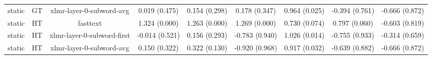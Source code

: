 \begin{sidewaystable}[htb]
\begin{tabular}{@{}ccccccccc@{}}
        static & GT & xlmr-layer-0-subword-avg & 0.019 (0.475) & 0.154 (0.298) & 0.178 (0.347) & 0.964 (0.025) & -0.394 (0.761) & -0.666 (0.872) \\
        static & HT & fasttext & 1.324 (0.000) & 1.263 (0.000) & 1.269 (0.000) & 0.730 (0.074) & 0.797 (0.060) & -0.603 (0.819) \\
        static & HT & xlmr-layer-0-subword-first & -0.014 (0.521) & 0.156 (0.293) & -0.783 (0.940) & 1.026 (0.014) & -0.755 (0.933) & -0.314 (0.659) \\
        static & HT & xlmr-layer-0-subword-avg & 0.150 (0.322) & 0.322 (0.130) & -0.920 (0.968) & 0.917 (0.032) & -0.639 (0.882) & -0.666 (0.872) \\
        \bottomrule
    \end{tabular}
\end{sidewaystable}